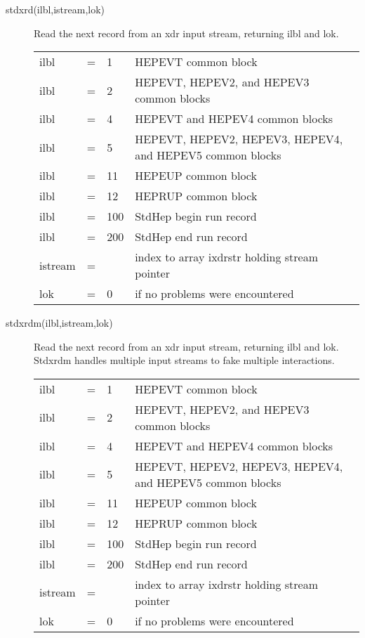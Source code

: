 \begin{description}
\item[stdxrd(ilbl,istream,lok)]
 Read the next record from an xdr input stream, returning ilbl and lok.

\begin{tabular}{lcll}
ilbl & = & 1   & HEPEVT common block \\
ilbl & = & 2   & HEPEVT, HEPEV2, and HEPEV3 common blocks \\
ilbl & = & 4   & HEPEVT and HEPEV4 common blocks \\
ilbl & = & 5   & HEPEVT, HEPEV2, HEPEV3, HEPEV4, and HEPEV5 common blocks \\
ilbl & = & 11  & HEPEUP common block \\
ilbl & = & 12  & HEPRUP common block \\
ilbl & = & 100 & StdHep begin run record \\
ilbl & = & 200 & StdHep end run record \\
istream & = &  & index to array ixdrstr holding stream pointer \\
lok  & = & 0   & if no problems were encountered \\
\end{tabular}

\item[stdxrdm(ilbl,istream,lok)]
 Read the next record from an xdr input stream, returning ilbl and lok.
 Stdxrdm handles multiple input streams to fake multiple interactions.

\begin{tabular}{lcll}
ilbl & = & 1   & HEPEVT common block \\
ilbl & = & 2   & HEPEVT, HEPEV2, and HEPEV3 common blocks \\
ilbl & = & 4   & HEPEVT and HEPEV4 common blocks \\
ilbl & = & 5   & HEPEVT, HEPEV2, HEPEV3, HEPEV4, and HEPEV5 common blocks \\
ilbl & = & 11  & HEPEUP common block \\
ilbl & = & 12  & HEPRUP common block \\
ilbl & = & 100 & StdHep begin run record \\
ilbl & = & 200 & StdHep end run record \\
istream & = &  & index to array ixdrstr holding stream pointer \\
lok  & = & 0   & if no problems were encountered \\
\end{tabular}


\end{description}
